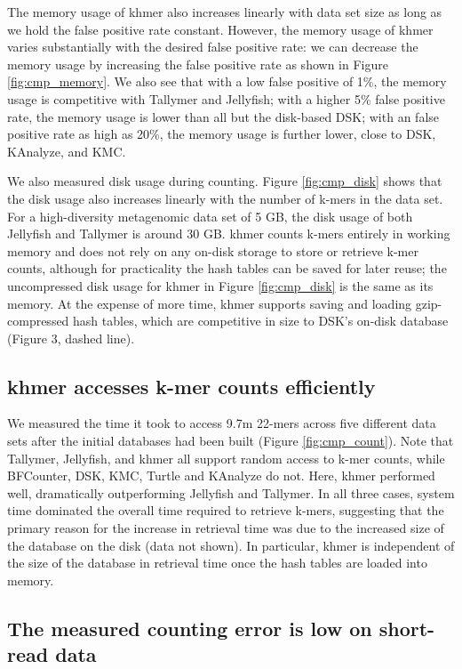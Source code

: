 The memory usage of khmer also increases linearly with data set size
as long as we hold the false positive rate constant.  However, the
memory usage of khmer varies substantially with the desired false
positive rate: we can decrease the memory usage by increasing the
false positive rate as shown in Figure \ref{fig:cmp_memory}.  We also
see that with a low false positive of 1\%, the memory usage is
competitive with Tallymer and Jellyfish; with a higher 5\% false
positive rate, the memory usage is lower than all but the disk-based
DSK; with an false positive rate as high as 20\%, the memory usage is
further lower, close to DSK, KAnalyze, and KMC.

We also measured disk usage during counting.  Figure
\ref{fig:cmp_disk} shows that the disk usage also increases linearly
with the number of k-mers in the data set.  For a high-diversity
metagenomic data set of 5 GB, the disk usage of both Jellyfish and
Tallymer is around 30 GB.  khmer counts k-mers entirely in working
memory and does not rely on any on-disk storage to store or retrieve
k-mer counts, although for practicality the hash tables can be saved
for later reuse; the uncompressed disk usage for khmer in Figure
\ref{fig:cmp_disk} is the same as its memory.  At the expense of more
time, khmer supports saving and loading gzip-compressed hash tables,
which are competitive in size to DSK's on-disk database (Figure 3,
dashed line).

\subsection{khmer accesses k-mer counts efficiently}

We measured the time it took to access 9.7m 22-mers across five
different data sets after the initial databases had been built (Figure
\ref{fig:cmp_count}).  Note that Tallymer, Jellyfish, and khmer all
support random access to k-mer counts, while BFCounter, DSK, KMC, Turtle and KAnalyze 
do not. Here, khmer
performed well, dramatically outperforming Jellyfish and Tallymer.  In
all three cases, system time dominated the overall time required to
retrieve k-mers, suggesting that the primary reason for the increase
in retrieval time was due to the increased size of the database on the
disk (data not shown).  In particular, khmer is independent of the
size of the database in retrieval time once the hash tables are loaded
into memory.

\subsection{The measured counting error is low on short-read data}

